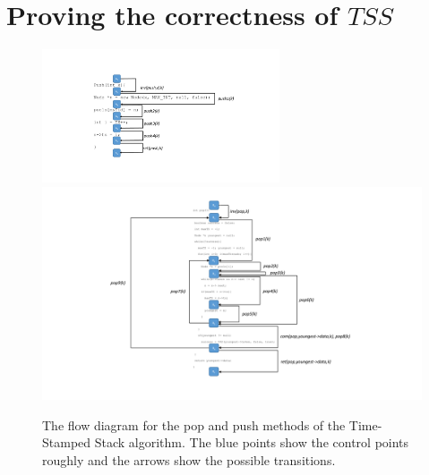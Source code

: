 \section{Proving the correctness of $TSS$}\label{app:tss}

%
\begin{figure}[t]
\centering
\includegraphics[width=7cm]{tssPushFlow.pdf}
\includegraphics[width=16cm]{tssPopFlow.pdf}
\vspace{-8mm}
\caption{The flow diagram for the pop and push methods of the Time-Stamped Stack algorithm. The blue points show the control points roughly and the arrows show the possible transitions.}
\label{fig:tssFlow}
\end{figure}



